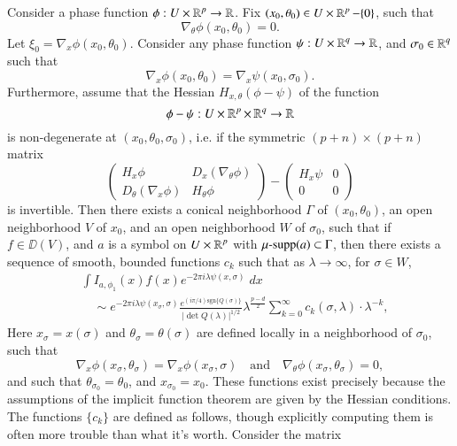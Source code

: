 \begin{theorem}
    Consider a phase function $\phi: U \times \operatorname{\mathbb{R}}^p \to \operatorname{\mathbb{R}}$. Fix $(x_0,\theta_0) \in U \times \operatorname{\mathbb{R}}^p - \{ 0 \}$, such that
    \[ \nabla_\theta \phi(x_0, \theta_0) = 0. \]
    Let $\xi_0 = \nabla_x \phi(x_0,\theta_0)$. Consider any phase function $\psi: U \times \operatorname{\mathbb{R}}^q \to \operatorname{\mathbb{R}}$, and $\sigma_0 \in \operatorname{\mathbb{R}}^q$ such that
    \[ \nabla_x \phi(x_0,\theta_0) = \nabla_x \psi(x_0,\sigma_0). \]
    Furthermore, assume that the Hessian $H_{x, \theta} (\phi - \psi)$ of the function
    \[ \phi - \psi: U \times \operatorname{\mathbb{R}}^p \times \operatorname{\mathbb{R}}^q \to \operatorname{\mathbb{R}} \]
    is non-degenerate at $(x_0,\theta_0,\sigma_0)$, i.e. if the symmetric $(p + n) \times (p + n)$ matrix
    \[ \begin{pmatrix} H_x \phi & D_x (\nabla_\theta \phi) \\ D_\theta (\nabla_x \phi) & H_\theta \phi \end{pmatrix} - \begin{pmatrix} H_x \psi & 0 \\ 0 & 0 \end{pmatrix} \]
    is invertible. Then there exists a conical neighborhood $\Gamma$ of $(x_0,\theta_0)$, an open neighborhood $V$ of $x_0$, and an open neighborhood $W$ of $\sigma_0$, such that if $f \in \DD(V)$, and $a$ is a symbol on $U \times \operatorname{\mathbb{R}}^p$ with $\operatorname{\text{$\mu$-supp}}(a) \subset \Gamma$, then there exists a sequence of smooth, bounded functions $c_k$ such that as $\lambda \to \infty$, for $\sigma \in W$,
    \begin{align*}
        & \int I_{a,\phi_1}(x) f(x) e^{-2 \pi i \lambda \psi(x,\sigma)}\; dx\\
        &\quad\sim e^{-2 \pi i \lambda \psi(x_\sigma,\sigma)} \frac{e^{(i\pi/4) \text{sgn} \{ Q(\sigma) \} }}{|\det Q(\lambda)|^{1/2}} \lambda^{\frac{p-d}{2}} \sum_{k = 0}^\infty c_k(\sigma,\lambda) \cdot \lambda^{-k},
    \end{align*}
    Here $x_\sigma = x(\sigma)$ and $\theta_\sigma = \theta(\sigma)$ are defined locally in a neighborhood of $\sigma_0$, such that
    \[ \nabla_x \phi(x_\sigma, \theta_\sigma) = \nabla_x \phi(x_\sigma, \sigma) \quad\text{and}\quad \nabla_\theta \phi(x_\sigma, \theta_\sigma) = 0, \]
    and such that $\theta_{\sigma_0} = \theta_0$, and $x_{\sigma_0} = x_0$. These functions exist precisely because the assumptions of the implicit function theorem are given by the Hessian conditions. The functions $\{ c_k \}$ are defined as follows, though explicitly computing them is often more trouble than what it's worth. Consider the matrix

\end{theorem}
